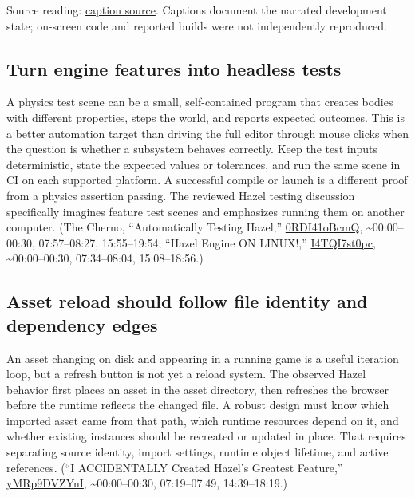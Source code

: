 Source reading: \href{https://www.youtube.com/watch?v=3ZFcvBjRFN0}{caption source}. Captions document the narrated development state; on-screen code and reported builds were not independently reproduced.

\subsection{Turn engine features into headless tests}\label{06-engine-ii-ch041-turn-engine-features-into-headless-tests}

A physics test scene can be a small, self-contained program that creates bodies with different properties, steps the world, and reports expected outcomes. This is a better automation target than driving the full editor through mouse clicks when the question is whether a subsystem behaves correctly. Keep the test inputs deterministic, state the expected values or tolerances, and run the same scene in CI on each supported platform. A successful compile or launch is a different proof from a physics assertion passing. The reviewed Hazel testing discussion specifically imagines feature test scenes and emphasizes running them on another computer. (The Cherno, ``Automatically Testing Hazel,'' \href{https://www.youtube.com/watch?v=0RDI41oBcmQ}{0RDI41oBcmQ}, \textasciitilde00:00--00:30, 07:57--08:27, 15:55--19:54; ``Hazel Engine ON LINUX!,'' \href{https://www.youtube.com/watch?v=I4TQI7st0pc}{I4TQI7st0pc}, \textasciitilde00:00--00:30, 07:34--08:04, 15:08--18:56.)

\subsection{Asset reload should follow file identity and dependency edges}\label{06-engine-ii-ch041-asset-reload-should-follow-file-identity-and-dependency-edges}

An asset changing on disk and appearing in a running game is a useful iteration loop, but a refresh button is not yet a reload system. The observed Hazel behavior first places an asset in the asset directory, then refreshes the browser before the runtime reflects the changed file. A robust design must know which imported asset came from that path, which runtime resources depend on it, and whether existing instances should be recreated or updated in place. That requires separating source identity, import settings, runtime object lifetime, and active references. (``I ACCIDENTALLY Created Hazel's Greatest Feature,'' \href{https://www.youtube.com/watch?v=yMRp9DVZYnI}{yMRp9DVZYnI}, \textasciitilde00:00--00:30, 07:19--07:49, 14:39--18:19.)

